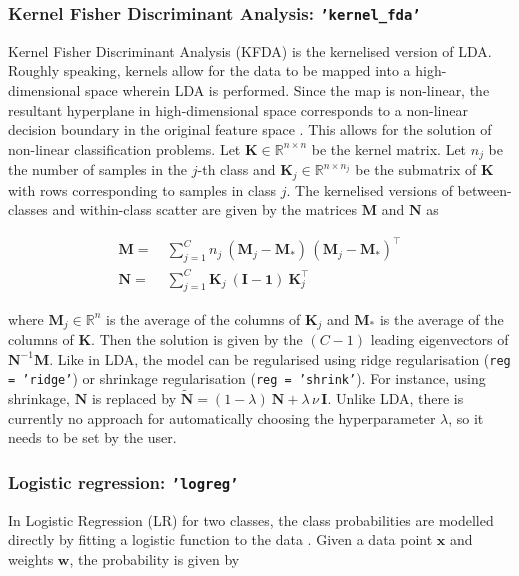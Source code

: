 \documentclass[utf8]{frontiersSCNS} %
\newcommand{\w}{\mathbf{w}}
\newcommand{\x}{\mathbf{x}}
\newcommand{\I}{\mathbf{I}}
\newcommand{\K}{\mathbf{K}}
\newcommand{\M}{\mathbf{M}}
\newcommand{\R}{\mathbb{R}}
\newcommand{\ttt}[1]{\texttt{#1}}
\begin{document}
\subsubsection{Kernel Fisher Discriminant Analysis: \ttt{'kernel\_fda'}}

Kernel Fisher Discriminant Analysis (KFDA) is the kernelised version of LDA. Roughly speaking, kernels allow for the data to be mapped into a high-dimensional space wherein LDA is performed. Since the map is non-linear, the resultant hyperplane in high-dimensional space corresponds to a non-linear decision boundary in the original feature space \cite{Mika1999FisherKernels}. This allows for the solution of non-linear classification problems. Let $\K\in\R^{n\times n}$ be the kernel matrix. Let $n_j$ be the number of samples in the $j$-th class and $\K_j\in\R^{n \times n_j}$ be the submatrix of $\K$ with rows corresponding to samples in class $j$. The kernelised versions of between-classes and within-class scatter are given by the matrices $\M$ and $\mathbf{N}$ as


\begin{equation*}
\begin{alignedat}{2}
\M =\ &  \sum_{j=1}^C n_j\ (\M_j - \M_*)\,(\M_j-\M_*)^\top\\
\mathbf{N} =\ & \sum_{j=1}^C \K_j\ (\mathbf{I} - \mathbf{1})\  \K_j^\top
\end{alignedat}
\end{equation*}

where $\M_j\in\R^n$ is the average of the columns of $\K_j$ and $\M_*$ is the average of the columns of $\K$. Then the solution is given by the $(C-1)$ leading eigenvectors of $\mathbf{N}^{-1} \mathbf{M}$. 
Like in LDA, the model can be regularised using ridge regularisation (\ttt{reg = 'ridge'}) or shrinkage regularisation (\ttt{reg = 'shrink'}). For instance, using shrinkage, $\mathbf{N}$ is replaced by $\widetilde{\mathbf{N}} = (1-\lambda)\ \mathbf{N} + \lambda\,\nu\,\I$. Unlike LDA, there is currently no approach for automatically choosing the hyperparameter $\lambda$, so it needs to be set by the user.

\subsubsection{Logistic regression: \ttt{'logreg'}}

In Logistic Regression (LR) for two classes, the class probabilities are modelled directly by fitting a logistic function to the data \citep{Hastie2009}. Given a data point $\x$ and weights $\w$, the probability is given by
\end{document}
